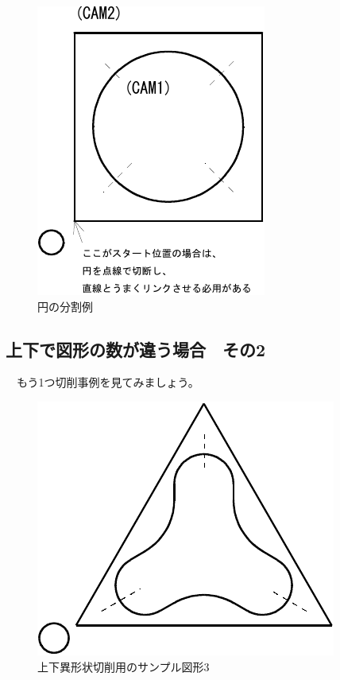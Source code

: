 \begin{minipage}[t]{0.5\textwidth}
\end{minipage}
\begin{minipage}[t]{0.5\textwidth}
\begin{figure}[H]
\centering
\includegraphics{No2/fig/sample4-crop.pdf}
\caption{円の分割例}
\label{fig:sample4.pdf}
\end{figure}
\end{minipage}

\subsection{上下で図形の数が違う場合　その2}
　もう1つ切削事例を見てみましょう。

\begin{figure}[H]
\centering
\includegraphics{No2/fig/sample5-crop.pdf}
\caption{上下異形状切削用のサンプル図形3}
\label{fig:sample5.pdf}
\end{figure}


